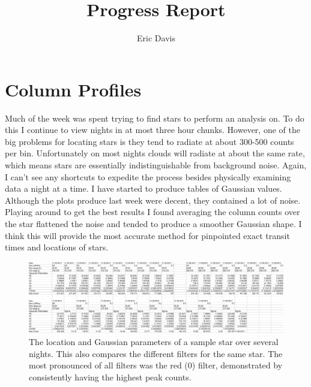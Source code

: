 \documentclass[11pt]{article}
\title{Progress Report}
\author{Eric Davis}
\begin{document}
\maketitle
\medskip



\section{Column Profiles}
\hspace{0.5cm}

Much of the week was spent trying to find stars to perform an analysis on. To do this I continue to view nights in at most three hour chunks. However, one of the big problems for locating stars is they tend to radiate at about 300-500 counts per bin. Unfortunately on most nights clouds will radiate at about the same rate, which means stars are essentially indistinguishable from background noise. Again, I can't see any shortcuts to expedite the process besides physically examining data a night at a time. I have started to produce tables of Gaussian values. Although the plots produce last week were decent, they contained a lot of noise. Playing around to get the best results I found averaging the column counts over the star flattened the noise and tended to produce a smoother Gaussian shape. I think this will provide the most accurate method for pinpointed exact transit times and locations of stars. 


\begin{figure}[h!]
\includegraphics[scale=0.4]{star_profile_spreadsheet.jpg}
\caption{The location and Gaussian parameters of a sample star over several nights. This also compares the different filters for the same star. The most pronounced of all filters was the red (0) filter, demonstrated by consistently having the highest peak counts.}
\end{figure}
\end{document}
